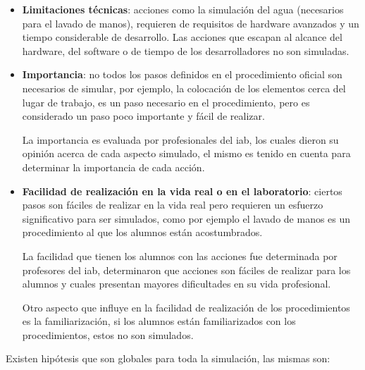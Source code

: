 \begin{itemize}

    \item \textbf{Limitaciones técnicas}: acciones como la simulación del agua
        (necesarios para el lavado de manos), requieren de requisitos de
        hardware avanzados y un tiempo considerable de desarrollo. Las acciones
        que escapan al alcance del hardware, del software o de tiempo de los
        desarrolladores no son simuladas.

    \item \textbf{Importancia}: no todos los pasos definidos en el procedimiento
        oficial son necesarios de simular, por ejemplo, la colocación de los
        elementos cerca del lugar de trabajo, es un paso necesario en el
        procedimiento, pero es considerado un paso poco importante y fácil de
        realizar.

        La importancia es evaluada por profesionales del \Gls{iab}, los cuales
        dieron su opinión acerca de cada aspecto simulado, el mismo es tenido en
        cuenta para determinar la importancia de cada acción.

    \item \textbf{Facilidad de realización en la vida real o en el laboratorio}:
        ciertos pasos son fáciles de realizar en la vida real pero requieren un
        esfuerzo significativo para ser simulados, como por ejemplo el lavado de
        manos es un procedimiento al que los alumnos están acostumbrados.

        La facilidad que tienen los alumnos con las acciones fue determinada por
        profesores del \Gls{iab}, determinaron que acciones son fáciles de
        realizar para los alumnos y cuales presentan mayores dificultades en su
        vida profesional.

        Otro aspecto que influye en la facilidad de realización de los
        procedimientos es la familiarización, si los alumnos están
        familiarizados con los procedimientos, estos no son simulados.

\end{itemize}
Existen hipótesis que son globales para toda la simulación, las mismas son:

